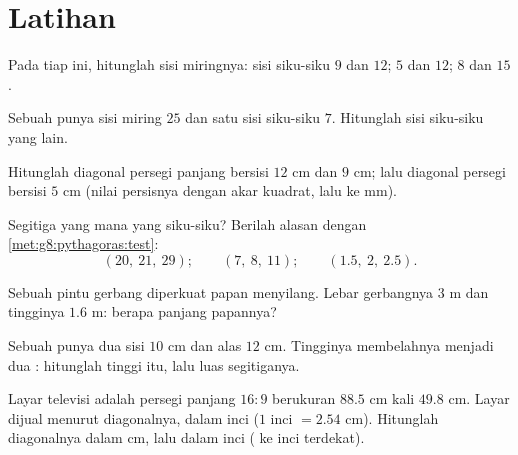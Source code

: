 \section{Latihan}

\begin{exercise}[$\star$]\label{exo:g8:pythagoras:1}
Pada tiap  ini, hitunglah sisi miringnya: sisi
siku-siku $9$ dan $12$; \quad $5$ dan $12$; \quad $8$ dan $15$.
\end{exercise}

\begin{exercise}[$\star$]\label{exo:g8:pythagoras:2}
Sebuah  punya sisi miring $25$ dan satu sisi
siku-siku $7$. Hitunglah sisi siku-siku yang lain.
\end{exercise}

\begin{exercise}[$\star$]\label{exo:g8:pythagoras:3}
Hitunglah diagonal persegi panjang bersisi $12$ cm dan $9$ cm; lalu
diagonal persegi bersisi $5$ cm (nilai persisnya dengan akar kuadrat,
lalu  ke mm).
\end{exercise}

\begin{exercise}[$\star$]\label{exo:g8:pythagoras:4}
Segitiga yang mana yang siku-siku? Berilah alasan dengan
\cref{met:g8:pythagoras:test}:
\[
(20,\ 21,\ 29); \qquad
(7,\ 8,\ 11); \qquad
(1.5,\ 2,\ 2.5).
\]
\end{exercise}

\begin{exercise}[$\star$]\label{exo:g8:pythagoras:5}
Sebuah pintu gerbang diperkuat papan menyilang. Lebar gerbangnya
$3$ m dan tingginya $1.6$ m: berapa panjang papannya?
\end{exercise}

\begin{exercise}[$\star$]\label{exo:g8:pythagoras:6}
Sebuah  punya dua sisi $10$ cm dan alas $12$ cm.
Tingginya membelahnya menjadi dua : hitunglah tinggi
itu, lalu luas segitiganya.
\end{exercise}

\begin{exercise}[$\star\star$]\label{exo:g8:pythagoras:7}
Layar televisi adalah persegi panjang $16{:}9$ berukuran $88.5$ cm
kali $49.8$ cm. Layar dijual menurut diagonalnya, dalam inci
($1$ inci $= 2.54$ cm). Hitunglah diagonalnya dalam cm, lalu dalam
inci ( ke inci terdekat).
\end{exercise}

